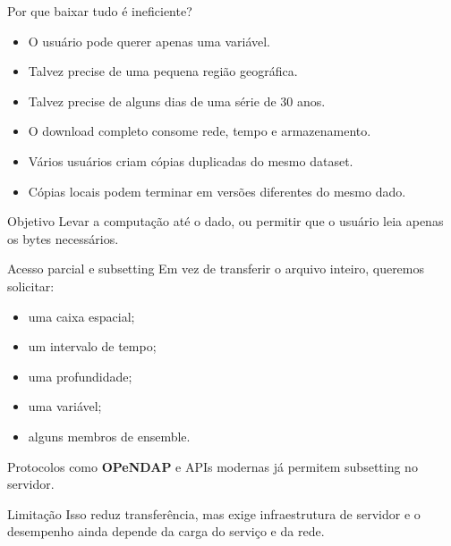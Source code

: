 \documentclass[aspectratio=169]{beamer}
\begin{document}
\begin{frame}{Por que baixar tudo é ineficiente?}
\begin{itemize}
  \item O usuário pode querer apenas uma variável.
  \item Talvez precise de uma pequena região geográfica.
  \item Talvez precise de alguns dias de uma série de 30 anos.
  \item O download completo consome rede, tempo e armazenamento.
  \item Vários usuários criam cópias duplicadas do mesmo dataset.
  \item Cópias locais podem terminar em versões diferentes do mesmo dado.
\end{itemize}

\vspace{0.3cm}

\begin{block}{Objetivo}
Levar a computação até o dado, ou permitir que o usuário leia apenas os bytes necessários.
\end{block}
\end{frame}

\begin{frame}{Acesso parcial e subsetting}
Em vez de transferir o arquivo inteiro, queremos solicitar:

\begin{itemize}
  \item uma caixa espacial;
  \item um intervalo de tempo;
  \item uma profundidade;
  \item uma variável;
  \item alguns membros de ensemble.
\end{itemize}

\vspace{0.4cm}

Protocolos como \textbf{OPeNDAP} e APIs modernas já permitem subsetting no servidor.

\vspace{0.3cm}

\begin{block}{Limitação}
Isso reduz transferência, mas exige infraestrutura de servidor e o desempenho ainda depende da carga do serviço e da rede.
\end{block}
\end{frame}
\end{document}
